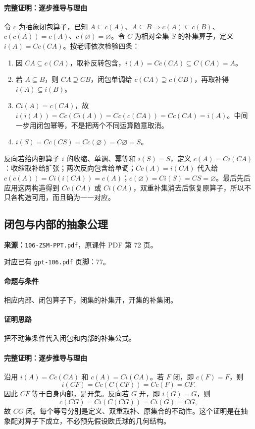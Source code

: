 \paragraph{完整证明：逐步推导与理由}

令 $c$ 为抽象闭包算子，已知 $A\subseteq c(A)$、$A\subseteq B\Rightarrow c(A)\subseteq c(B)$、$c(c(A))=c(A)$、$c(\varnothing)=\varnothing$。令 $C$ 为相对全集 $S$ 的补集算子，定义 $i(A)=Cc(CA)$。按老师依次检验四条：
\begin{enumerate}
\item 因 $CA\subseteq c(CA)$，取补反转包含，$i(A)=Cc(CA)\subseteq C(CA)=A$。
\item 若 $A\subseteq B$，则 $CA\supseteq CB$，闭包单调给 $c(CA)\supseteq c(CB)$，再取补得 $i(A)\subseteq i(B)$。
\item $Ci(A)=c(CA)$，故 $i(i(A))=Cc(Ci(A))=Cc(c(CA))=Cc(CA)=i(A)$。中间一步用闭包幂等，不是把两个不同运算随意取消。
\item $i(S)=Cc(CS)=Cc(\varnothing)=C\varnothing=S$。
\end{enumerate}
反向若给内部算子 $i$ 的收缩、单调、幂等和 $i(S)=S$，定义 $c(A)=Ci(CA)$：收缩取补给扩张；两次反向包含给单调；$Cc(A)=i(CA)$ 代入给 $c(c(A))=Ci(i(CA))=c(A)$；$c(\varnothing)=Ci(S)=CS=\varnothing$。最后先后应用这两构造得到 $Cc(CA)$ 或 $Ci(CA)$，双重补集消去后恢复原算子，所以不只各构造可用，而且确为一一对应。

\clearpage\subsection{闭包与内部的抽象公理}
\textbf{来源：}\texttt{106-ZSM-PPT.pdf}，原课件 PDF 第 72 页。\par
对应已有 \texttt{gpt-106.pdf} 页脚：77。\par
\paragraph{命题与条件}相应内部、闭包算子下，闭集的补集开，开集的补集闭。
\paragraph{证明思路}把不动集条件代入闭包和内部的补集公式。
\paragraph{完整证明：逐步推导与理由}

沿用 $i(A)=Cc(CA)$ 和 $c(A)=Ci(CA)$。若 $F$ 闭，即 $c(F)=F$，则
\[i(CF)=Cc(C(CF))=Cc(F)=CF.\]
因此 $CF$ 等于自身内部，是开集。反向若 $G$ 开，即 $i(G)=G$，则
\[c(CG)=Ci(C(CG))=Ci(G)=CG,\]
故 $CG$ 闭。每个等号分别是定义、双重取补、原集合的不动性。这个证明是在抽象配对算子下成立，不必预先假设欧氏球的几何结构。

